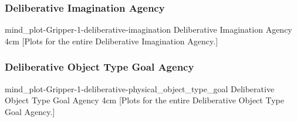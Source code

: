 {\newpage
  \noindent\begin{minipage}{\textwidth}
    \subsubsection{Deliberative Imagination Agency}
    \experimentcausegroupplots{\dataappendixmaxtime}
                           {\dataappendixexperimentonemaxtime}
                           {\dataappendixexperimenttwomaxtime}
                           {\dataappendixexperimentthreemaxtime}
                           {\dataappendixexperimentonename}
                           {\dataappendixexperimenttwoname}
                           {\dataappendixexperimentthreename}
                           {\dataappendixexperimentoneprettyname}
                           {\dataappendixexperimenttwoprettyname}
                           \experimentcausegroupplotscontinued{\dataappendixexperimentthreeprettyname}
                                                              {mind_plot-Gripper-1-deliberative-imagination}
                                                              {Deliberative Imagination Agency}
                                                              {\experimentdatacommontablereference}
                                                              {4cm}
    \experimentdatablocksworldexample
    [Plots for the entire
      Deliberative Imagination Agency.]{}
  \label{figure:mind_plot-Gripper-1-deliberative-imagination}
  \end{minipage}
}
{\newpage
  \noindent\begin{minipage}{\textwidth}
    \subsubsection{Deliberative Object Type Goal Agency}
    \experimentcausegroupplots{\dataappendixmaxtime}
                           {\dataappendixexperimentonemaxtime}
                           {\dataappendixexperimenttwomaxtime}
                           {\dataappendixexperimentthreemaxtime}
                           {\dataappendixexperimentonename}
                           {\dataappendixexperimenttwoname}
                           {\dataappendixexperimentthreename}
                           {\dataappendixexperimentoneprettyname}
                           {\dataappendixexperimenttwoprettyname}
                           \experimentcausegroupplotscontinued{\dataappendixexperimentthreeprettyname}
                                                              {mind_plot-Gripper-1-deliberative-physical_object_type_goal}
                                                              {Deliberative Object Type Goal Agency}
                                                              {\experimentdatacommontablereference}
                                                              {4cm}
    \experimentdatablocksworldexample
    [Plots for the entire
      Deliberative Object Type Goal Agency.]{}
  \label{figure:mind_plot-Gripper-1-deliberative-physical_object_type_goal}
  \end{minipage}
}
